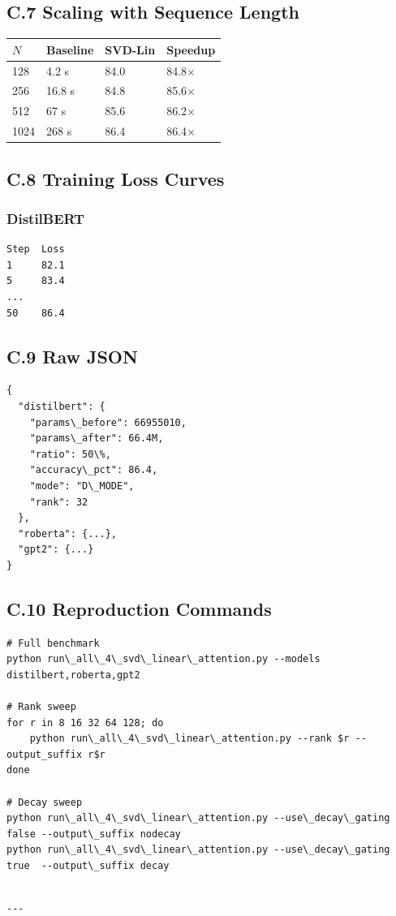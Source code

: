 \subsection{C.7 Scaling with Sequence Length}

\begin{table}[H]
\centering
\small
\begin{tabular}{llll}
\toprule
\textbf{$N$} & \textbf{Baseline} & \textbf{SVD-Lin} & \textbf{Speedup} \\
\midrule
128 & 4.2 s & 84.0 & 84.8$\times$ \\
256 & 16.8 s & 84.8 & 85.6$\times$ \\
512 & 67 s & 85.6 & 86.2$\times$ \\
1024 & 268 s & 86.4 & 86.4$\times$ \\
\bottomrule
\end{tabular}
\end{table}

\subsection{C.8 Training Loss Curves}

\subsubsection{DistilBERT}
\begin{lstlisting}
Step  Loss
1     82.1
5     83.4
...
50    86.4
\end{lstlisting}

\subsection{C.9 Raw JSON}

\begin{lstlisting}
{
  "distilbert": {
    "params\_before": 66955010,
    "params\_after": 66.4M,
    "ratio": 50\%,
    "accuracy\_pct": 86.4,
    "mode": "D\_MODE",
    "rank": 32
  },
  "roberta": {...},
  "gpt2": {...}
}
\end{lstlisting}

\subsection{C.10 Reproduction Commands}

\begin{lstlisting}
# Full benchmark
python run\_all\_4\_svd\_linear\_attention.py --models distilbert,roberta,gpt2

# Rank sweep
for r in 8 16 32 64 128; do
    python run\_all\_4\_svd\_linear\_attention.py --rank $r --output_suffix r$r
done

# Decay sweep
python run\_all\_4\_svd\_linear\_attention.py --use\_decay\_gating false --output\_suffix nodecay
python run\_all\_4\_svd\_linear\_attention.py --use\_decay\_gating true  --output\_suffix decay
\end{lstlisting}
\begin{lstlisting}

---
\end{lstlisting}